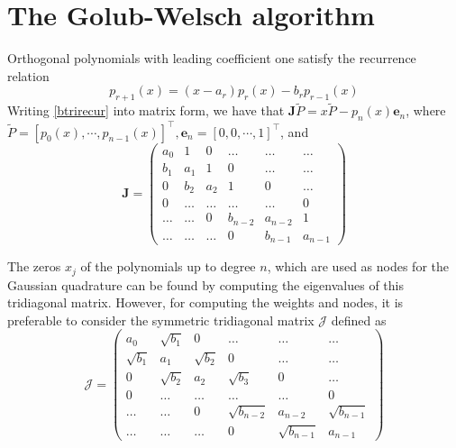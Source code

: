 \documentclass[conference,onecolumn,12pt]{IEEEtran}
\theoremstyle{definition}
\begin{document}
\section{The Golub-Welsch algorithm}
\label{gwalg}
Orthogonal polynomials with leading coefficient one satisfy the recurrence relation 
\begin{equation}
    \label{btrirecur}
    p_{r+1}(x) = (x-a_r)p_r(x) -b_r p_{r-1}(x)
\end{equation}
Writing \ref{btrirecur} into matrix form, we have that $\mathbf{J}\tilde{P}=x\tilde{P}-p_n(x) \mathbf{e}_n$, where $\tilde{P}=[p_0(x),\cdots,p_{n-1}(x)]^\top, \mathbf{e}_n=[0,0,\cdots,1]^\top$, and 
\begin{equation}
    \mathbf{J}=\begin{pmatrix}
        a_0 &      1 &      0 &  \ldots &  \ldots &  \ldots \\
        b_1 &    a_1 &      1 &       0 &  \ldots &  \ldots \\
          0 &    b_2 &    a_2 &       1 &       0 &  \ldots \\
          0 & \ldots & \ldots &  \ldots &  \ldots &       0 \\
     \ldots & \ldots &      0 & b_{n-2} & a_{n-2} &       1 \\
     \ldots & \ldots & \ldots &       0 & b_{n-1} & a_{n-1}
   \end{pmatrix}
\end{equation}

The zeros $x_j$ of the polynomials up to degree $n$, which are used as nodes for the Gaussian quadrature can be found by computing the eigenvalues of this tridiagonal matrix. However, for computing the weights and nodes, it is preferable to consider the symmetric tridiagonal matrix $\mathcal{J}$ defined as
\begin{equation}
    \mathcal{J}=\begin{pmatrix}
        a_0 &      \sqrt{b_1} &      0 &  \ldots &  \ldots &  \ldots \\
        \sqrt{b_1} &    a_1 &      \sqrt{b_2} &       0 &  \ldots &  \ldots \\
          0 &    \sqrt{b_2} &    a_2 &  \sqrt{b_3} &       0 &  \ldots \\
          0 & \ldots & \ldots &  \ldots &  \ldots &       0 \\
     \ldots & \ldots &      0 & \sqrt{b_{n-2}} & a_{n-2} &       \sqrt{b_{n-1}} \\
     \ldots & \ldots & \ldots &       0 & \sqrt{b_{n-1}} & a_{n-1}
   \end{pmatrix}
\end{equation}
\end{document}
